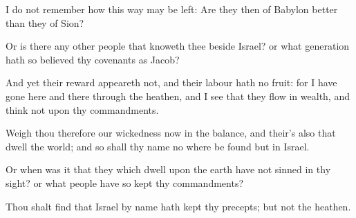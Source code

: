 {\par }{\PP {}I do not remember how this way may be left: Are they then of Babylon better than they of Sion?
\par }{\PP {}Or is there any other people that knoweth thee beside Israel? or what generation hath so believed thy covenants as Jacob?
\par }{\PP {}And yet their reward appeareth not, and their labour hath no fruit: for I have gone here and there through the heathen, and I see that they flow in wealth, and think not upon thy commandments.
\par }{\PP {}Weigh thou therefore our wickedness now in the balance, and their’s also that dwell the world; and so shall thy name no where be found but in Israel.
\par }{\PP {}Or when was it that they which dwell upon the earth have not sinned in thy sight? or what people have so kept thy commandments?
\par }{\PP {}Thou shalt find that Israel by name hath kept thy precepts; but not the heathen.

}
